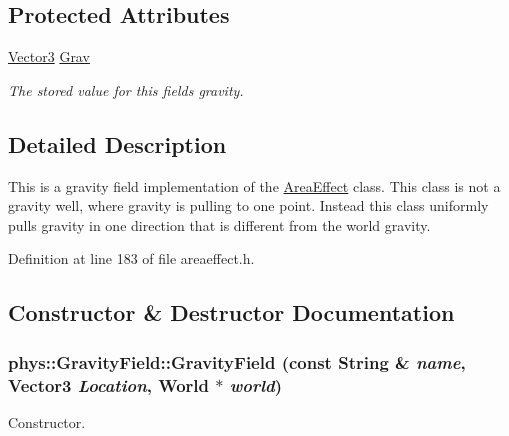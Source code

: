 \subsection*{Protected Attributes}
\begin{DoxyCompactItemize}
\item 
\hypertarget{classphys_1_1GravityField_a14084e696d0848db88b4a91413245849}{
\hyperlink{classphys_1_1Vector3}{Vector3} \hyperlink{classphys_1_1GravityField_a14084e696d0848db88b4a91413245849}{Grav}}
\label{d4/d8a/classphys_1_1GravityField_a14084e696d0848db88b4a91413245849}

\begin{DoxyCompactList}\small\item\em The stored value for this fields gravity. \item\end{DoxyCompactList}\end{DoxyCompactItemize}


\subsection{Detailed Description}
This is a gravity field implementation of the \hyperlink{classphys_1_1AreaEffect}{AreaEffect} class. This class is not a gravity well, where gravity is pulling to one point. Instead this class uniformly pulls gravity in one direction that is different from the world gravity. 

Definition at line 183 of file areaeffect.h.



\subsection{Constructor \& Destructor Documentation}
\hypertarget{classphys_1_1GravityField_a7a5ebfbd93b166aab3d586270f9b8724}{
\subsubsection[{GravityField}]{\setlength{\rightskip}{0pt plus 5cm}phys::GravityField::GravityField (const {\bf String} \& {\em name}, \/  {\bf Vector3} {\em Location}, \/  {\bf World} $\ast$ {\em world})}}
\label{d4/d8a/classphys_1_1GravityField_a7a5ebfbd93b166aab3d586270f9b8724}


Constructor. 

